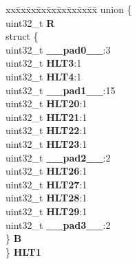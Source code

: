 \begin{DoxyCompactItemize}
\begin{tabbing}
\end{tabbing}\item 
\mbox{\label{structSIU__tag_af225f319d65c60529a6817d160e41ba5}} 
\begin{tabbing}
xx\=xx\=xx\=xx\=xx\=xx\=xx\=xx\=xx\=\kill
union \{\\
\>uint32\_t {\bfseries R}\\
\>struct \{\\
\>\>uint32\_t {\bfseries \_\_pad0\_\_}:3\\
\>\>uint32\_t {\bfseries HLT3}:1\\
\>\>uint32\_t {\bfseries HLT4}:1\\
\>\>uint32\_t {\bfseries \_\_pad1\_\_}:15\\
\>\>uint32\_t {\bfseries HLT20}:1\\
\>\>uint32\_t {\bfseries HLT21}:1\\
\>\>uint32\_t {\bfseries HLT22}:1\\
\>\>uint32\_t {\bfseries HLT23}:1\\
\>\>uint32\_t {\bfseries \_\_pad2\_\_}:2\\
\>\>uint32\_t {\bfseries HLT26}:1\\
\>\>uint32\_t {\bfseries HLT27}:1\\
\>\>uint32\_t {\bfseries HLT28}:1\\
\>\>uint32\_t {\bfseries HLT29}:1\\
\>\>uint32\_t {\bfseries \_\_pad3\_\_}:2\\
\>\} {\bfseries B}\\
\} {\bfseries HLT1}\\


\end{tabbing}
\end{DoxyCompactItemize}
